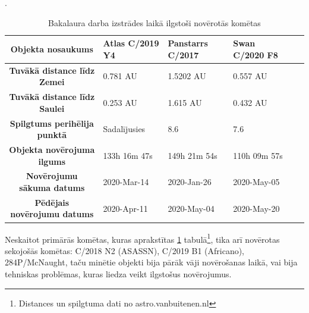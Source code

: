 \begin{table}[h!]
\centering
\caption{Bakalaura darba izstrādes laikā ilgstoši novērotās komētas}.
\begin{tabular}{|c|l|l|l|l|l|}
\hline
\textbf{Objekta nosaukums} & \textbf{Atlas C/2019 Y4} & \textbf{Panstarrs C/2017} & \textbf{Swan C/2020 F8}  \\ \hline
\textbf{Tuvākā distance līdz Zemei} & 0.781 AU & 1.5202 AU  &  0.557 AU  \\ \hline
\textbf{Tuvākā distance līdz Saulei} & 0.253 AU & 	1.615 AU &  0.432 AU  \\ \hline
\textbf{Spilgtums perihēlija punktā}           & Sadalījusies & 8.6  &  7.6   \\ \hline
\textbf{Objekta novērojuma ilgums}       & 133h 16m 47s & 149h 21m 54s &  110h 09m 57s \\ \hline
\textbf{Novērojumu sākuma datums}       & 2020-Mar-14 & 2020-Jan-26 &  2020-May-05 \\ \hline
\textbf{Pēdējais novērojumu datums}       & 2020-Apr-11 & 2020-May-04 &  2020-May-20 \\ \hline

\end{tabular}

\label{tab:main-objects}
\end{table}


Neskaitot primārās komētas, kuras aprakstītas \ref{tab:main-objects} tabulā\footnote{Distances un spilgtuma dati no astro.vanbuitenen.nl}, tika arī novērotas sekojošās komētas: C/2018 N2 (ASASSN), C/2019 B1 (Africano), 284P/McNaught, taču minētie objekti bija pārāk vāji novērošanas laikā, vai bija tehniskas problēmas, kuras liedza veikt ilgstošus novērojumus.




